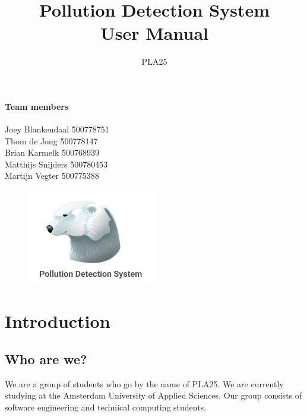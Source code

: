 \documentclass[a4paper]{article}
\title{Pollution Detection System\\User Manual}
\author{PLA25}
\begin{document}
\maketitle
\vspace*{\fill}



\paragraph{Team members}
\begin{tabbing}
	Joey Blankendaal 	\` 	500778751 	\\
	Thom de Jong 		\` 	500778147 	\\
	Brian Karmelk 		\` 	500768939 	\\
	Matthijs Snijders 	\` 	500780453 	\\
	Martijn Vegter 		\` 	500775388
\end{tabbing}

\begin{figure}
  \centering
  \includegraphics[width=0.5\textwidth]{front-page}
\end{figure}
\thispagestyle{empty}
\newpage

\tableofcontents
\newpage

\section{Introduction}

\subsection{Who are we?}
We are a group of students who go by the name of PLA25. We are currently studying at the Amsterdam University of Applied Sciences. Our group consists of software engineering and technical computing students.
\end{document}
